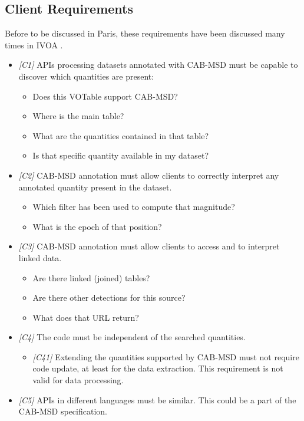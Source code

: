\documentclass[11pt,a4paper]{ivoa}
\begin{document}
\subsection{Client Requirements}
Before to be discussed in Paris, these requirements have been discussed many times in IVOA
.
\begin{itemize}
    \item  \textit{[C1]} APIs processing datasets annotated with CAB-MSD must be capable to discover which quantities are present:
    \begin{itemize}
        \item Does this VOTable support CAB-MSD?
        \item Where is the main table?
        \item What are the quantities contained in that table?
        \item Is that specific quantity available in my dataset?
    \end{itemize}
\end{itemize}
\begin{itemize}
    \item \textit{[C2]} CAB-MSD annotation must allow clients to correctly interpret any annotated quantity present in the dataset.
    \begin{itemize}
        \item Which filter has been used to compute that magnitude?
        \item What is the epoch of that position?
    \end{itemize}
\end{itemize}
\begin{itemize}
    \item  \textit{[C3]} CAB-MSD annotation must allow clients to access and to interpret linked data.
    \begin{itemize}
        \item Are there linked (joined) tables?
        \item Are there other detections for this source?
        \item What does that  URL return?
    \end{itemize}
\end{itemize}

\begin{itemize}
    \item \textit{[C4]} The code must be independent of the searched quantities.
    \begin{itemize}
        \item \textit{[C41]} Extending the quantities supported by CAB-MSD must not require code update, at least for the data extraction. This requirement is not valid for data processing.
    \end{itemize}
\end{itemize}
\begin{itemize}
    \item \textit{[C5]} APIs in different languages must be similar. This could be a part of the CAB-MSD specification.
\end{itemize}
\end{document}

